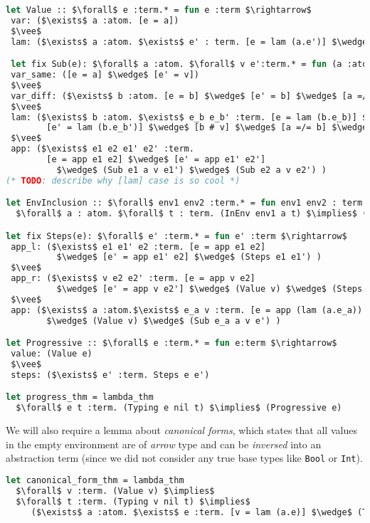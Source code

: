 \documentclass[english, mgr]{iithesis}
\renewcommand{\tt}[1]{\texttt{\small{#1}}}
\renewcommand{\it}[1]{\textit{#1}}
\begin{document}
\begin{lstlisting}[mathescape,language=OCaml]
let Value :: $\forall$ e :term.* = fun e :term $\rightarrow$
 var: ($\exists$ a :atom. [e = a])
 $\vee$
 lam: ($\exists$ a :atom. $\exists$ e' : term. [e = lam (a.e')] $\wedge$ (Term e'))

 let fix Sub(e): $\forall$ a :atom. $\forall$ v e':term.* = fun (a :atom) (v e' :term) $\rightarrow$
 var_same: ([e = a] $\wedge$ [e' = v])
 $\vee$
 var_diff: ($\exists$ b :atom. [e = b] $\wedge$ [e' = b] $\wedge$ [a =/= b])
 $\vee$
 lam: ($\exists$ b :atom. $\exists$ e_b e_b' :term. [e = lam (b.e_b)] $\wedge$
        [e' = lam (b.e_b')] $\wedge$ [b # v] $\wedge$ [a =/= b] $\wedge$ (Sub e_b a v e_b') )
 $\vee$
 app: ($\exists$ e1 e2 e1' e2' :term.
        [e = app e1 e2] $\wedge$ [e' = app e1' e2']
          $\wedge$ (Sub e1 a v e1') $\wedge$ (Sub e2 a v e2') )
(* TODO: describe why [lam] case is so cool *)

let EnvInclusion :: $\forall$ env1 env2 :term.* = fun env1 env2 : term $\rightarrow$
  $\forall$ a : atom. $\forall$ t : term. (InEnv env1 a t) $\implies$ (InEnv env2 a t)

let fix Steps(e): $\forall$ e' :term.* = fun e' :term $\rightarrow$
 app_l: ($\exists$ e1 e1' e2 :term. [e = app e1 e2]
          $\wedge$ [e' = app e1' e2] $\wedge$ (Steps e1 e1') )
 $\vee$
 app_r: ($\exists$ v e2 e2' :term. [e = app v e2]
          $\wedge$ [e' = app v e2'] $\wedge$ (Value v) $\wedge$ (Steps e2 e2') )
 $\vee$
 app: ($\exists$ a :atom.$\exists$ e_a v :term. [e = app (lam (a.e_a)) v]
        $\wedge$ (Value v) $\wedge$ (Sub e_a a v e') )

let Progressive :: $\forall$ e :term.* = fun e:term $\rightarrow$
 value: (Value e)
 $\vee$
 steps: ($\exists$ e' :term. Steps e e')

let progress_thm = lambda_thm
  $\forall$ e t :term. (Typing e nil t) $\implies$ (Progressive e)
\end{lstlisting}
We will also require a lemma about \it{canonical forms},
which states that all values in the empty environment
are of \it{arrow} type and can be \it{inversed} into an abstraction term
(since we did not consider any true base types like \tt{Bool} or \tt{Int}).
\begin{lstlisting}[mathescape,language=OCaml]
let canonical_form_thm = lambda_thm
  $\forall$ v :term. (Value v) $\implies$
  $\forall$ t :term. (Typing v nil t) $\implies$
     ($\exists$ a :atom. $\exists$ e :term. [v = lam (a.e)] $\wedge$ (Term e))
\end{lstlisting}
\end{document}
